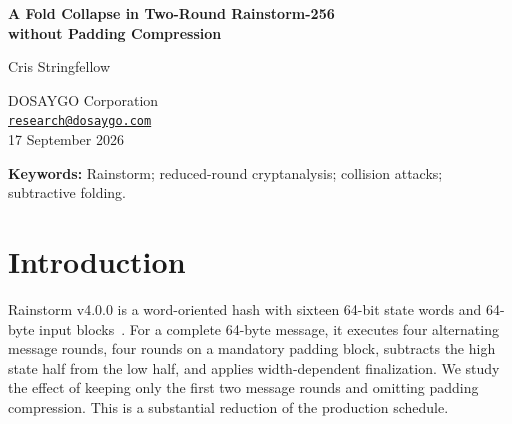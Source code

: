 \documentclass[10pt]{article}
\theoremstyle{definition}
\begin{document}
\begin{center}
{\LARGE\bfseries\color{Navy} A Fold Collapse in Two-Round Rainstorm-256\\without Padding Compression}\par
\vspace{0.7em}
{\large Cris Stringfellow}\par
DOSAYGO Corporation\\
\href{mailto:research@dosaygo.com}{\texttt{research@dosaygo.com}}\\
\vspace{0.4em}
17 September 2026
\end{center}

\begin{abstract}
We give an algebraic collision reduction for a precisely specified variant of Rainstorm v4.0.0: one 64-byte message block, seed zero, two message rounds, no padding compression, and the unchanged fold and output finalization. A uniquely programmable first round produces a family of distinct messages indexed by one 64-bit word. On this family five folded words vanish identically, and equality of a sixth word implies equality of the complete 256-bit digest. We prove this implication, including preservation through finalization, and exhibit a concrete collision found using 4,070,333,044 evaluations of the resulting 64-bit map, plus 33,707 replay evaluations. This is an observed cost; an expected birthday-scale search cost requires a random-mapping heuristic. One restored padding round preserves five fold equalities but introduces an additional aggregate condition. The result identifies a specific interaction between message programming, cross-half XOR, and subtractive folding. It does not give a collision attack on production Rainstorm, which uses four message rounds and four padding rounds. We include the complete restricted-target definition and an executable witness verifier.
\end{abstract}
\noindent\textbf{Keywords:} Rainstorm; reduced-round cryptanalysis; collision attacks; subtractive folding.

\section{Introduction}
Rainstorm v4.0.0 is a word-oriented hash with sixteen 64-bit state words and 64-byte input blocks~\cite{rainstorm-v4}. For a complete 64-byte message, it executes four alternating message rounds, four rounds on a mandatory padding block, subtracts the high state half from the low half, and applies width-dependent finalization. We study the effect of keeping only the first two message rounds and omitting padding compression. This is a substantial reduction of the production schedule.
\end{document}
